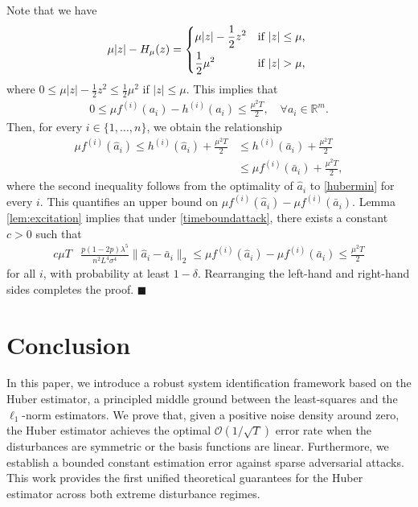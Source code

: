 \documentclass[letterpaper,10pt,conference]{ieeeconf}
\theoremstyle{plain} %
\theoremstyle{plain} %
\theoremstyle{plain} %
\theoremstyle{plain}
\begin{document}
 Note that we have
    \begin{align*}
     \mu |z|-  H_\mu(z)  = \begin{dcases*}
         \mu|z| - \frac{1}{2}z^2 & if $|z|\le \mu$,\\ \frac{1}{2}\mu^2 & if $|z| > \mu$,
     \end{dcases*} 
    \end{align*}
    where $0\le \mu|z| - \frac{1}{2}z^2 \le \frac{1}{2}\mu^2$ if $|z| \le \mu$. This implies that 
    \begin{align*}
     0\le    \mu f^{(i)}(a_i) - h^{(i)}(a_i) \le \frac{\mu^2 T}{2}, \quad \forall a_i\in \mathbb{R}^m.
    \end{align*}
    Then, for every $i\in\{1,\dots,n\}$,  we obtain the relationship
    \begin{align*}
         \mu f^{(i)}(\hat a_i) \le h^{(i)}(\hat a_i) +  \frac{\mu^2 T}{2} &\le h^{(i)}(\bar a_i) +  \frac{\mu^2 T}{2}\\&\le \mu f^{(i)}(\bar a_i) +  \frac{\mu^2 T}{2},
    \end{align*}
where the second inequality follows from the optimality of $\hat a_i$ to \eqref{hubermin} for every $i$. This quantifies an upper bound on  $\mu f^{(i)}(\hat a_i)-\mu f^{(i)}(\bar a_i)$.  Lemma \ref{lem:excitation} implies that under \eqref{timeboundattack}, there exists a constant $c>0$ such that
\begin{align*}
  c\mu T &\frac{p(1-2p)\lambda^5 }{n^2 L^4\sigma^4 } \|\hat a_i - \bar a_i\|_2  \le \mu f^{(i)}(\hat a_i)-\mu f^{(i)}(\bar a_i) \le  \frac{\mu^2 T}{2}
\end{align*}
  for all $i$, with probability at least $1-\delta$. Rearranging the left-hand  and right-hand sides completes the proof.
\hfill $\blacksquare$


\section{Conclusion} \label{sec:conclusion}
In this paper, we introduce a robust system identification framework based on the Huber estimator,  a principled middle ground between the least-squares and the $\ell_1$-norm estimators. We prove that, given a positive noise density around zero, the Huber estimator achieves the optimal $\mathcal{O}(1/\sqrt{T})$ error rate when the disturbances are symmetric or the basis functions are linear.  Furthermore, we establish a bounded constant estimation error against sparse adversarial attacks.
This work provides the first unified theoretical guarantees for the Huber estimator across both extreme disturbance regimes. 









\printbibliography
\end{document}
